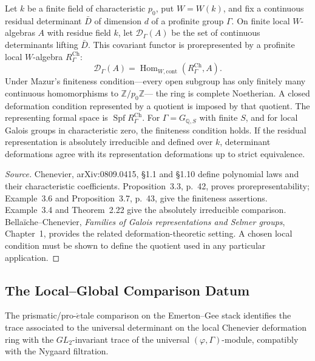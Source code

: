 \begin{proposition}
\label{v4-arith:w5-h:prop:chenevier-moduli-via-det-trace}
\ClaimStatusProvedElsewhere
Let $k$ be a finite field of characteristic $p_0$, put $W=W(k)$,
and fix a continuous residual determinant $\bar D$ of dimension $d$
of a profinite group $\Gamma$. On finite local $W$-algebras $A$
with residue field $k$, let $\mathcal D_\Gamma(A)$ be the set of
continuous determinants lifting $\bar D$. This covariant functor
is prorepresented by a profinite local $W$-algebra $R_\Gamma^{\mathrm{Ch}}$:
\[
 \mathcal D_\Gamma(A)=
 \operatorname{Hom}_{W,\mathrm{cont}}(R_\Gamma^{\mathrm{Ch}},A).
\]
Under Mazur's finiteness condition---every open subgroup has only
finitely many continuous homomorphisms to $\mathbb Z/p_0\mathbb Z$---
the ring is complete Noetherian. A closed deformation condition
represented by a quotient is imposed by that quotient.
The representing formal space is $\operatorname{Spf}R_\Gamma^{\mathrm{Ch}}$.
For $\Gamma=G_{\mathbb Q,S}$ with finite $S$, and for local Galois
groups in characteristic zero, the finiteness condition holds.
If the residual representation is absolutely irreducible and defined
over $k$, determinant deformations agree with its representation
deformations up to strict equivalence.
\end{proposition}

\begin{proof}[Source]
Chenevier, arXiv:0809.0415, \S1.1 and \S1.10 define polynomial
laws and their characteristic coefficients. Proposition~3.3,
p.~42, proves prorepresentability; Example~3.6 and
Proposition~3.7, p.~43, give the finiteness assertions.
Example~3.4 and Theorem~2.22 give the absolutely irreducible
comparison. Bella\"iche--Chenevier, \emph{Families of Galois
representations and Selmer groups}, Chapter~1, provides the related
deformation-theoretic setting. A chosen local condition must be
shown to define the quotient used in any particular application.
\end{proof}

\subsection{The Local--Global Comparison Datum}

\begin{conjecture}
\label{v4-arith:w5-h:conj:pseudocharacter-trace-comparison}
\ClaimStatusConjectured The prismatic/pro-\(\acute{e}\)tale comparison on
the Emerton--Gee stack identifies the trace associated to the universal determinant
on the local Chenevier deformation ring with the
\(GL_{2}\)-invariant trace of the universal
\((\varphi,\Gamma)\)-module, compatibly with the Nygaard filtration.
\end{conjecture}

